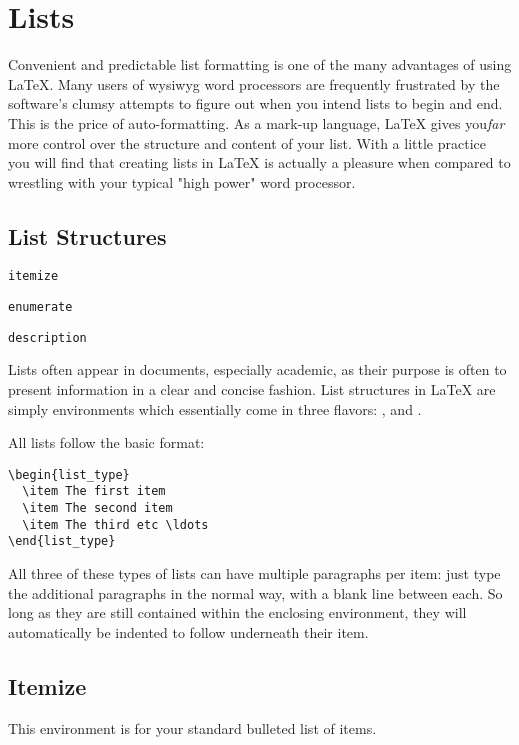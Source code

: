 \section{Lists}
Convenient and predictable list formatting is one of the many advantages of
using LaTeX. Many users of wysiwyg word processors are frequently frustrated by
the software's clumsy attempts to figure out when you intend lists to begin and
end. This is the price of auto-formatting. As a mark-up language, LaTeX gives
you\textit{far} more control over the structure and content of your list. With
a little practice you will find that creating lists in LaTeX is actually a
pleasure when compared to wrestling with your typical "high power" word
processor.
\subsection{List Structures}
 \begin{lstlisting}
itemize
\end{lstlisting}
  \begin{lstlisting}
enumerate
\end{lstlisting}
  \begin{lstlisting}
description
\end{lstlisting}
 Lists often appear in documents, especially academic, as their purpose is
often to present information in a clear and concise fashion. List structures in
LaTeX are simply environments which essentially come in three flavors: ,  and .

All lists follow the basic format:
\begin{lstlisting}
\begin{list_type}
  \item The first item
  \item The second item
  \item The third etc \ldots
\end{list_type}
\end{lstlisting}

All three of these types of lists can have multiple paragraphs per item: just
type the additional paragraphs in the normal way, with a blank line between
each. So long as they are still contained within the enclosing environment,
they will automatically be indented to follow underneath their item.

\subsection{Itemize}
This environment is for your standard bulleted list of items.

